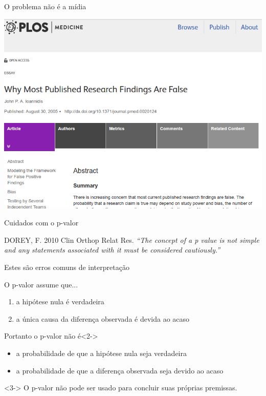 \documentclass{beamer}
\begin{document}
\begin{frame}{\scriptsize O problema não é a mídia}
  \begin{center}
    \includegraphics[height=.9\textheight]{Cap10-11/Ioannidis}
  \end{center}
\end{frame}

\begin{frame}{\scriptsize Cuidados com o p-valor}
    \begin{block}{{\small DOREY, F. 2010 Clin Orthop Relat Res.}}
    \footnotesize
    {\em ``The concept of a p value is not simple and any statements
    associated with it must be considered cautiously.''}
  \end{block}
\end{frame}

\begin{frame}{\scriptsize Estes são erros comuns de interpretação}
  \small
  \begin{block}{O p-valor assume que...}
    \footnotesize
    \begin{enumerate}
      \footnotesize
    \item a hipótese nula é \alert<1>{verdadeira}
    \item a \alert<1>{única} causa da diferença observada é devida ao acaso
    \end{enumerate}
  \end{block}
  \begin{block}{Portanto o p-valor \alert{não é}}<2->
    \footnotesize
    \begin{itemize}
      \footnotesize
    \item a probabilidade de que a hipótese nula seja verdadeira
    \item a probabilidade de que a diferença observada seja devido ao
      acaso
    \end{itemize}
    \begin{block}{}<3->
      \footnotesize
      O p-valor não pode ser usado para concluir suas próprias
      premissas.
    \end{block}
  \end{block}
\end{frame}
\end{document}
